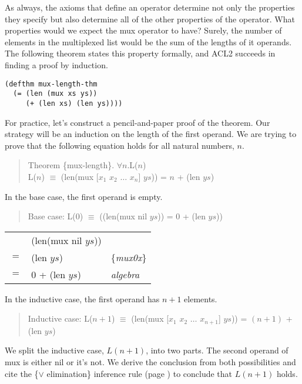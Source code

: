 As always, the axioms that define an operator
determine not only the properties they specify
but also determine all of the other properties of the operator.
What properties would we expect the mux operator to have?
Surely, the number of elements in the multiplexed list
would be the sum of the lengths of it operands.
The following theorem states this property formally,
and ACL2 succeeds in finding a proof by induction.

\label{mux-length-thm}
\begin{Verbatim}
(defthm mux-length-thm
  (= (len (mux xs ys))
     (+ (len xs) (len ys))))
\end{Verbatim}

For practice, let's construct a pencil-and-paper proof of the theorem.
Our strategy will be an induction on the length of the first operand.
We are trying to prove that the following equation holds for all natural numbers, $n$.
\begin{quote}
Theorem \{mux-length\}. $\forall n.$L($n$)\\
L($n$) $\equiv$ (len(mux [$x_1$ $x_2$ $\dots$ $x_n$] $ys$)) = $n$ + (len $ys$) \\
\end{quote}

In the base case, the first operand is empty.
\begin{quote}
Base case: L($0$) $\equiv$ ((len(mux nil $ys$)) = 0 + (len $ys$))
\end{quote}
\begin{center}
\begin{tabular}{lll}
     & (len(mux nil $ys$))    &                 \\
 $=$ & (len $ys$)             & \{\emph{mux0x}\}\\
 $=$ & 0 + (len $ys$)         & \emph{algebra}  \\
\end{tabular}
\end{center}

In the inductive case, the first operand has $n+1$ elements.
\begin{quote}
\label{mux-length-thm-induc-case}
Inductive case: L($n+1$) $\equiv$ (len(mux [$x_1$ $x_2$ $\dots$ $x_{n+1}$] $ys$)) = $(n+1)$ + (len $ys$)
\end{quote}

We split the inductive case, $L(n+1)$, into two parts.
The second operand of mux is either nil or it's not.
We derive the conclusion from both possibilities and cite the \{$\vee$ elimination\}
inference rule (page \pageref{fig-02-deduction-rules})
to conclude that $L(n+1)$ holds.

